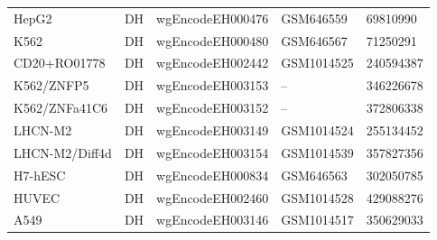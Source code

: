 \begin{longtable}{p{3.5cm}p{1.2cm}p{3.7cm}p{2.5cm}p{2.8cm}}
HepG2 & DH & wgEncodeEH000476 & GSM646559 & 69810990 \\
K562 & DH & wgEncodeEH000480 & GSM646567 & 71250291 \\
CD20+RO01778 & DH & wgEncodeEH002442 & GSM1014525 & 240594387 \\
K562/ZNFP5 & DH & wgEncodeEH003153 & -- & 346226678 \\
K562/ZNFa41C6 & DH & wgEncodeEH003152 & -- & 372806338 \\
LHCN-M2 & DH & wgEncodeEH003149 & GSM1014524 & 255134452 \\
LHCN-M2/Diff4d & DH & wgEncodeEH003154 & GSM1014539 & 357827356 \\
H7-hESC & DH & wgEncodeEH000834 & GSM646563 & 302050785 \\
HUVEC & DH & wgEncodeEH002460 & GSM1014528 & 429088276 \\
A549 & DH & wgEncodeEH003146 & GSM1014517 & 350629033 \\
\hline
\end{longtable}

\clearpage

